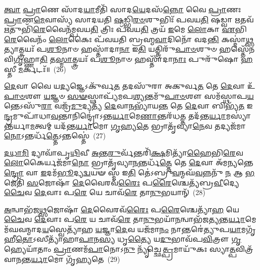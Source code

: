 \-\ul{𑌤𑍍𑌵𑌾} \ul{𑌪𑍍𑌰𑌾}\-𑌣𑍇 𑌸𑌾᳴𑌦\-\ul{𑌯𑌾}\-𑌮𑍀𑌤𑌿᳴ 𑌸𑌾𑌦\-\ul{𑌯𑍇}\-𑌦𑌸᳴\-\ul{𑌨𑍍𑌨𑍋} 𑌵𑍈 \ul{𑌪𑍍𑌰𑌾}\-𑌣𑌃 \ul{𑌪𑍍𑌰𑌾}\-𑌣\-\ul{𑌮𑍇}\-𑌵𑌾𑌸𑍍𑌯᳴ 𑌸𑌾𑌦𑌯𑌤𑌿 \ul{𑌷}\-𑌡𑍍𑌭𑌿\-\ul{𑌰}\-\-\ul{𑍞}\-𑌶𑍁𑌭𑌿𑌃᳴ 𑌪𑌵𑌯\-\ul{𑌤𑌿} 𑌷𑌡𑍍𑌵𑌾 \ul{𑌋}\-𑌤𑌵᳴ \ul{𑌋}\-𑌤𑍁𑌭𑌿᳴\-\ul{𑌰𑍇}\-𑌵𑍈𑌨᳴𑌮𑍍𑌪𑌵𑌯\-\ul{𑌤𑌿} 𑌤𑍍𑌰𑌿𑌃 𑌪᳴𑌵𑌯\-\ul{𑌤𑌿} 𑌤𑍍𑌰𑌯᳴ \ul{𑌇}\-𑌮𑍇 \ul{𑌲𑍋}\-𑌕𑌾 \ul{𑌏}\-𑌭𑌿\-\ul{𑌰𑍇}\-𑌵𑍈𑌨𑌂᳴ \ul{𑌲𑍋}\-𑌕𑍈𑌃 𑌪᳴𑌵𑌯𑌤𑌿 𑌬𑍍𑌰𑌹𑍍𑌮\-\ul{𑌵𑌾}\-𑌦𑌿𑌨𑍋᳴ 𑌵𑌦\-\ul{𑌨𑍍𑌤𑌿} 𑌕𑌸𑍍𑌮𑌾॑\-\ul{𑌥𑍍𑌸}\-𑌤𑍍𑌯𑌾𑌤𑍍𑌤𑍍𑌰𑌯𑌃᳴ 𑌪\-\ul{𑌶𑍂}\-𑌨𑌾𑍞 𑌹𑌸𑍍𑌤𑌾᳴𑌦𑌾\-\ul{𑌨𑌾} 𑌇\-\ul{𑌤𑌿} 𑌯𑌤𑍍𑌤𑍍𑌰𑌿𑌰𑍁᳴\-\ul{𑌪𑌾}\-\-\ul{𑍞}\-𑌶𑍁𑍞 𑌹𑌸𑍍𑌤𑍇᳴𑌨 𑌵𑌿\-\ul{𑌗𑍃}\-𑌹𑍍𑌣𑌾\-\ul{𑌤𑌿} 𑌤\-\ul{𑌸𑍍𑌮𑌾}\-𑌤𑍍𑌤𑍍𑌰𑌯𑌃᳴ 𑌪\-\ul{𑌶𑍂}\-𑌨𑌾𑍞 𑌹𑌸𑍍𑌤𑌾᳴𑌦𑌾\-\ul{𑌨𑌾𑌃} 𑌪𑍁𑌰𑍁᳴𑌷𑍋 \ul{𑌹}\-𑌸𑍍𑌤𑍀 \ul{𑌮}\-𑌰𑍍𑌕𑌟𑌃᳴॥~(26)

{\anuvakamend[{𑌮𑌾𑌧𑍍𑌯᳴𑌨𑍍𑌦𑌿𑌨\-\ul{𑌮}\-𑌷𑍍𑌟𑌾𑌵᳴𑌷𑍍𑌟𑌾\-\ul{𑌵𑍇}\-𑌷 𑌮𑌨᳴𑌸𑍍𑌤𑍍𑌵𑌾 \ul{𑌪}\-𑌰𑍍𑌜\-\ul{𑌨𑍍𑌯𑍋}\-\-𑌽𑌮𑍁\-\ul{𑌷𑍍𑌯} 𑌪𑍁𑌰𑍁᳴\-\ul{𑌷𑍋} 𑌦𑍍𑌵𑍇 𑌚᳴}]}%

\-\ul{𑌦𑍇}\-𑌵𑌾 𑌵𑍈 𑌯\-\ul{𑌦𑍍𑌯}\-𑌜𑍍𑌞𑍇\-𑌽𑌕𑍁᳴𑌰𑍍𑌵\-\ul{𑌤} 𑌤𑌦𑌸𑍁᳴𑌰𑌾 𑌅𑌕𑍁𑌰𑍍𑌵\-\ul{𑌤} 𑌤𑍇 \ul{𑌦𑍇}\-𑌵𑌾 𑌉᳴\-\ul{𑌪𑌾}\-\-\ul{𑍞}\-𑌶𑍗 \ul{𑌯}\-𑌜𑍍𑌞𑍞 \ul{𑌸}\-\-\ul{𑍟}\-𑌸𑍍𑌥𑌾𑌪𑍍𑌯᳴𑌮𑌪\-\ul{𑌶𑍍𑌯}\-𑌨𑍍𑌤𑌮𑍁᳴\-\ul{𑌪𑌾}\-\-\ul{𑍞}\-𑌶𑍗 𑌸𑌮᳴𑌸𑍍𑌥𑌾𑌪\-\ul{𑌯}\-𑌨𑍍𑌤𑍇\-𑌽𑌸𑍁᳴\-\ul{𑌰𑌾} 𑌵𑌜𑍍𑌰᳴\-\ul{𑌮𑍁}\-𑌦𑍍𑌯𑌤𑍍𑌯᳴ \ul{𑌦𑍇}\-𑌵𑌾\-\ul{𑌨}\-𑌭𑍍𑌯𑌾᳴𑌯\-\ul{𑌨𑍍𑌤} 𑌤𑍇 \ul{𑌦𑍇}\-𑌵𑌾 𑌬𑌿𑌭𑍍𑌯᳴\-\ul{𑌤} 𑌇\-\ul{𑌨𑍍𑌦𑍍𑌰}\-𑌮𑍁𑌪𑌾᳴𑌧𑌾\-\ul{𑌵}\-𑌨𑍍𑌤𑌾𑌨𑌿𑌨𑍍𑌦𑍍𑌰𑍋॑\-𑌽𑌨𑍍𑌤\-\ul{𑌰𑍍𑌯𑌾}\-𑌮𑍇\-\ul{𑌣𑌾}\-𑌨𑍍𑌤𑌰᳴𑌧\-\ul{𑌤𑍍𑌤} 𑌤𑌦᳴𑌨𑍍𑌤\-\ul{𑌰𑍍𑌯𑌾}\-𑌮𑌸𑍍𑌯𑌾॑𑌨𑍍𑌤𑌰𑍍𑌯𑌾\-\ul{𑌮}\-𑌤𑍍𑌵𑌮𑍍 𑌯𑌦᳴𑌨𑍍𑌤\-\ul{𑌰𑍍𑌯𑌾}\-𑌮𑍋 \ul{𑌗𑍃}\-𑌹𑍍𑌯\-\ul{𑌤𑍇} 𑌭𑍍𑌰𑌾𑌤𑍃᳴𑌵𑍍𑌯𑌾\-\ul{𑌨𑍇}\-𑌵 𑌤𑌦𑍍𑌯𑌜᳴𑌮𑌾\-\ul{𑌨𑍋}\-\-𑌽𑌨𑍍𑌤𑌰𑍍𑌧᳴\-\ul{𑌤𑍍𑌤𑍇}\-\-𑌽𑌨𑍍𑌤𑌸𑍍𑌤𑍇॑~(27)

\-\ul{𑌦}\-\-\ul{𑌧𑌾}\-\-\ul{𑌮𑌿} 𑌦𑍍𑌯𑌾𑌵𑌾᳴𑌪𑍃\-\ul{𑌥𑌿}\-𑌵𑍀 \ul{𑌅}\-𑌨𑍍𑌤\-\ul{𑌰𑍁}\-𑌰𑍍𑌵᳴𑌨𑍍𑌤𑌰𑌿᳴\-\ul{𑌕𑍍𑌷}\-𑌮𑌿𑌤𑍍𑌯𑌾᳴\-\ul{𑌹𑍈}\-𑌭𑌿\-\ul{𑌰𑍇}\-𑌵 \ul{𑌲𑍋}\-𑌕𑍈𑌰𑍍𑌯𑌜᳴𑌮𑌾\-\ul{𑌨𑍋} 𑌭𑍍𑌰𑌾𑌤𑍃᳴𑌵𑍍𑌯𑌾\-\ul{𑌨}\-𑌨𑍍𑌤𑌰𑍍𑌧᳴\-\ul{𑌤𑍍𑌤𑍇} 𑌤𑍇 \ul{𑌦𑍇}\-𑌵𑌾 𑌅᳴𑌮\-\ul{𑌨𑍍𑌯}\-𑌨𑍍𑌤𑍇\-\ul{𑌨𑍍𑌦𑍍𑌰𑍋} 𑌵𑌾 \ul{𑌇}\-𑌦𑌮᳴\-\ul{𑌭𑍂}\-𑌦𑍍𑌯\-\ul{𑌦𑍍𑌵}\-𑌯𑍟 𑌸𑍍𑌮 𑌇\-\ul{𑌤𑌿} 𑌤𑍇॑\-𑌽𑌬𑍍𑌰𑍁\-\ul{𑌵}\-𑌨𑍍𑌮𑌘᳴\-\ul{𑌵}\-𑌨𑍍𑌨𑌨𑍁᳴ \ul{𑌨} 𑌆 \ul{𑌭}\-𑌜𑍇𑌤𑌿᳴ \ul{𑌸}\-𑌜𑍋𑌷𑌾᳴ \ul{𑌦𑍇}\-𑌵𑍈𑌰𑌵᳴\-\ul{𑌰𑍈𑌃} 𑌪\-\ul{𑌰𑍈}\-𑌶𑍍𑌚𑍇𑌤𑍍𑌯᳴𑌬𑍍𑌰\-\ul{𑌵𑍀}\-𑌦𑍍𑌯𑍇 \ul{𑌚𑍈}\-𑌵 \ul{𑌦𑍇}\-𑌵𑌾𑌃 𑌪\-\ul{𑌰𑍇} 𑌯𑍇 𑌚𑌾𑌵᳴\-\ul{𑌰𑍇} 𑌤𑌾\-\ul{𑌨𑍁}\-𑌭𑌯𑌾𑌨𑍍᳴~(28)

\-\ul{𑌅}\-𑌨𑍍𑌵𑌾𑌭᳴𑌜\-\ul{𑌥𑍍𑌸}\-𑌜𑍋𑌷𑌾᳴ \ul{𑌦𑍇}\-𑌵𑍈𑌰𑌵᳴\-\ul{𑌰𑍈𑌃} 𑌪\-\ul{𑌰𑍈}\-𑌶𑍍𑌚𑍇𑌤𑍍𑌯𑌾᳴\-\ul{𑌹} 𑌯𑍇 \ul{𑌚𑍈}\-𑌵 \ul{𑌦𑍇}\-𑌵𑌾𑌃 𑌪\-\ul{𑌰𑍇} 𑌯 𑌚𑌾𑌵᳴\-\ul{𑌰𑍇} 𑌤𑌾\-\ul{𑌨𑍁}\-𑌭𑌯𑌾᳴\-\ul{𑌨}\-𑌨𑍍𑌵𑌾𑌭᳴𑌜𑌤𑍍𑌯𑌨𑍍𑌤\-\ul{𑌰𑍍𑌯𑌾}\-𑌮𑍇 𑌮᳴𑌘𑌵𑌨𑍍𑌮𑌾𑌦\-\ul{𑌯}\-𑌸𑍍𑌵𑍇𑌤𑍍𑌯𑌾᳴𑌹 \ul{𑌯}\-𑌜𑍍𑌞𑌾\-\ul{𑌦𑍇}\-𑌵 𑌯𑌜᳴𑌮𑌾\-\ul{𑌨𑌂} 𑌨𑌾𑌨𑍍𑌤𑌰𑍇॑𑌤𑍍𑌯𑍁𑌪\-\ul{𑌯𑌾}\-𑌮𑌗𑍃᳴𑌹𑍀\-\ul{𑌤𑍋}\-\-𑌽𑌸𑍀𑌤𑍍𑌯𑌾᳴𑌹𑌾\-\ul{𑌪𑌾}\-𑌨\-\ul{𑌸𑍍𑌯} 𑌧𑍃\-\ul{𑌤𑍍𑌯𑍈} 𑌯\-\ul{𑌦𑍁}\-𑌭𑌾𑌵᳴𑌪\-\ul{𑌵𑌿}\-𑌤𑍍𑌰𑍗 \ul{𑌗𑍃}\-𑌹𑍍𑌯𑍇𑌯𑌾᳴𑌤𑌾𑌂 \ul{𑌪𑍍𑌰𑌾}\-𑌣𑌮᳴\-\ul{𑌪𑌾}\-𑌨𑍋\-𑌽\-\ul{𑌨𑍁} 𑌨𑍍𑌯𑍃᳴𑌚𑍍𑌛𑍇\-\ul{𑌤𑍍𑌪𑍍𑌰}\-𑌮𑌾𑌯𑍁᳴𑌕𑌃 𑌸𑍍𑌯𑌾\-\ul{𑌤𑍍𑌪}\-𑌵𑌿𑌤𑍍𑌰᳴𑌵𑌾𑌨𑌨𑍍𑌤\-\ul{𑌰𑍍𑌯𑌾}\-𑌮𑍋 𑌗𑍃᳴𑌹𑍍𑌯𑌤𑍇~(29)


